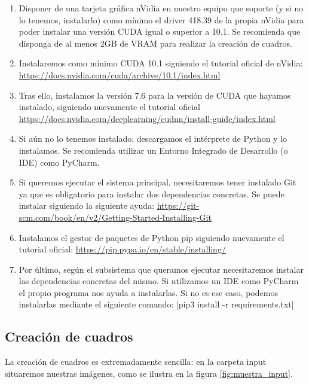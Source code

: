 \documentclass[../main.tex]{subfiles}
\begin{document}
\begin{enumerate}
    \item Disponer de una tarjeta gráfica nVidia en nuestro equipo que soporte (y si no lo tenemos, instalarlo)  como mínimo el driver 418.39 de la propia nVidia para poder instalar una versión CUDA igual o superior a 10.1. Se recomienda que disponga de al menos 2GB de VRAM para realizar la creación de cuadros.
    \item Instalaremos como mínimo CUDA 10.1 siguiendo el tutorial oficial de nVidia: \url{https://docs.nvidia.com/cuda/archive/10.1/index.html}
    \item Tras ello, instalamos la versión 7.6 para la versión de CUDA que hayamos instalado, siguiendo nuevamente el tutorial oficial \url{https://docs.nvidia.com/deeplearning/cudnn/install-guide/index.html}
    \item Si aún no lo tenemos instalado, descargamos el intérprete de Python y lo instalamos. Se recomienda utilizar un Entorno Integrado de Desarrollo (o IDE) como PyCharm.
    \item Si queremos ejecutar el sistema principal, necesitaremos tener instalado Git ya que es obligatorio para instalar dos dependencias concretas. Se puede instalar siguiendo la siguiente ayuda: \url{https://git-scm.com/book/en/v2/Getting-Started-Installing-Git}
    \item Instalamos el gestor de paquetes de Python pip siguiendo nuevamente el tutorial oficial: \url{https://pip.pypa.io/en/stable/installing/}
    \item Por último, según el subsistema que queramos ejecutar necesitaremos instalar las dependencias concretas del mismo. Si utilizamos un IDE como PyCharm el propio programa nos ayuda a instalarlas. Si no es ese caso, podemos instalarlas mediante el siguiente comando: |pip3 install -r requirements.txt| 
\end{enumerate}

\subsection{Creación de cuadros}

La creación de cuadros es extremadamente sencilla: en la carpeta input situaremos nuestras imágenes, como se ilustra en la figura \ref{fig:muestra_input}.
\end{document}
